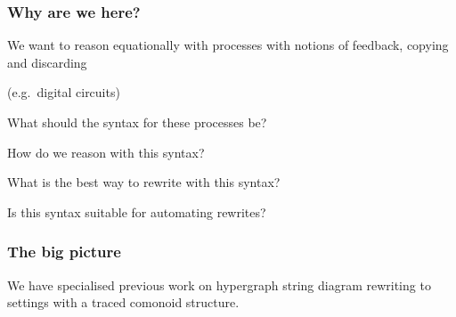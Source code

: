 \begin{frame}
    \frametitle{Why are we here?}

    \await
    \centering
    \LARGE

    We want to reason \alert{equationally} with \alert{processes} with notions of
    \alert{feedback}, \alert{copying} and \alert{discarding}

    \normalsize
    (e.g.\ \alert{digital circuits})

    \large
    \await

    \vspace{1em}

    What should the \alert{syntax} for these processes be?

    \await

    How do we \alert{reason} with this syntax?

    \await

    What is the best way to \alert{rewrite} with this syntax?

    \await

    Is this syntax suitable for \alert{automating} rewrites?

\end{frame}
\begin{frame}
    \frametitle{The big picture}

    \centering
    \LARGE

    We have \alert{specialised} previous work on
    \alert{hypergraph string diagram rewriting} to settings with a
    \alert{traced comonoid structure}.

\end{frame}

